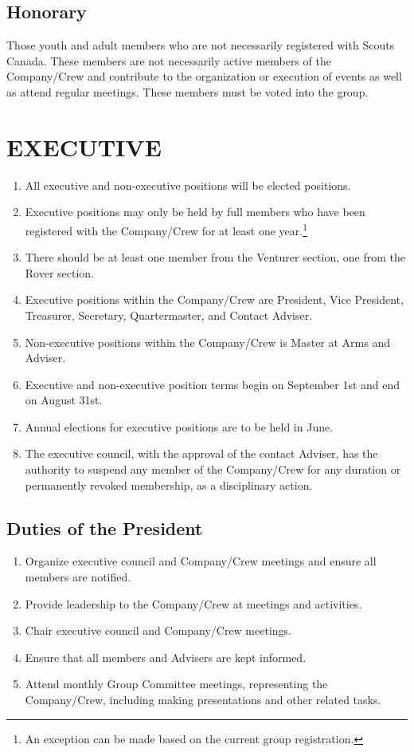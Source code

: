 \documentclass{Service_Corps_Document}
\begin{document}
\subsection{Honorary}
Those youth and adult members who are not necessarily registered with Scouts Canada. These members are not necessarily active members of the Company/Crew and contribute to the organization or execution of events as well as attend regular meetings. These members must be voted into the group.
\section{EXECUTIVE}
\begin{enumerate}
	\item All executive and non-executive positions will be elected positions.
	\item Executive positions may only be held by full members who have been registered with the Company/Crew for at least one year.\footnote{An exception can be made based on the current group registration.}
	\item There should be at least one member from the Venturer section, one from the Rover section. \footnotemark[\value{footnote}]
	\item Executive positions within the Company/Crew are President, Vice President, Treasurer, Secretary, Quartermaster, and Contact Adviser.
	\item Non-executive positions within the Company/Crew is Master at Arms and Adviser. 
	\item Executive and non-executive position terms begin on September 1st and end on August 31st.
	\item Annual elections for executive positions are to be held in June.
	\item The executive council, with the approval of the contact Adviser, has the authority to suspend any member of the Company/Crew for any duration or permanently revoked membership, as a disciplinary action.
\end{enumerate}
\subsection{Duties of the President}
\begin{enumerate}
	\item Organize executive council and Company/Crew meetings and ensure all members are notified.
	\item Provide leadership to the Company/Crew at meetings and activities. 
	\item Chair executive council and Company/Crew meetings.
	\item Ensure that all members and Advisers are kept informed.
	\item Attend monthly Group Committee meetings, representing the Company/Crew, including making presentations and other related tasks.
\end{enumerate}
\end{document}
